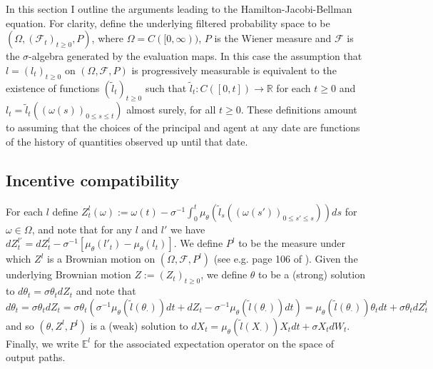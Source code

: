 \documentclass[11pt]{article}
\theoremstyle{plain}
\begin{document}
In this section I outline the arguments leading to the Hamilton-Jacobi-Bellman equation. For clarity, define the underlying filtered probability space to be $(\Omega, (\mathcal{F}_t)_{t\geq0},P)$, where $\Omega = C([0,\infty))$, $P$ is the Wiener measure and $\mathcal{F}$ is the $\sigma$-algebra generated by the evaluation maps. In this case the assumption that $l=(l_t)_{t\geq0}$ on $(\Omega, \mathcal{F}, P)$ is progressively measurable is equivalent to the existence of functions $(\tilde{l}_t)_{t\geq0}$ such that $\tilde{l}_t: C([0,t]) \rightarrow \mathbb{R}$ for each $t\geq 0$ and $l_t = \tilde{l}_t((\omega(s))_{0\leq s\leq t})$ almost surely, for all $t \geq0$. These definitions amount to assuming that the choices of the principal and agent at any date are functions of the history of quantities observed up until that date. 

\subsection{Incentive compatibility} \label{ICapp}

For each $l$ define $Z^l_t(\omega) := \omega(t) - \sigma^{-1}\int_{0}^{t}\mu_{\theta}(\tilde{l}_s((\omega(s'))_{0\leq s'\leq s}))ds$ for $\omega \in \Omega$, and note 
that for any $l$ and $l'$ we have $dZ^{l'}_t = dZ^l_t - \sigma^{-1}[\mu_{\theta}(l'_{t}) - \mu_{\theta}(l_{t})]$. We define $P^l$ to be the measure under which $Z^l$ is a Brownian motion on $(\Omega, \mathcal{F}, P^l)$ (see e.g. page 106 of \cite{cvitanic_optimal_2009}). Given the underlying Brownian motion $Z := (Z_t)_{t\geq0}$, we define $\theta$ to be a (strong) solution to $d\theta_t = \sigma \theta_t dZ_t$ and note that
$$
d\theta_t = \sigma \theta_t dZ_t =  \sigma \theta_t {\left(\sigma^{-1}\mu_{\theta}(\tilde{l}(\theta_{\cdot}))dt + dZ_t - \sigma^{-1}\mu_{\theta}(\tilde{l}(\theta_{\cdot}))dt\right)} = \mu_{\theta}(\tilde{l}(\theta_{\cdot}))\theta_t dt + \sigma \theta_t dZ^l_t
$$
and so $(\theta, Z^l, P^l)$ is a (weak) solution to $dX_t = \mu_{\theta}(\tilde{l}(X_{\cdot}))X_t dt + \sigma X_t dW_t$. Finally, we write $\mathbb{E}^l$ for the associated expectation operator on the space of output paths. 
\end{document}
